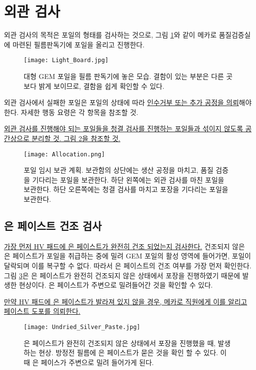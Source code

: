 \section{외관 검사}
외관 검사의 목적은 포일의 형태를 검사하는 것으로, 그림 \ref{fig:light_board}와 같이 메카로 품질검증실에 마련된 필름판독기에 포일을 올리고 진행한다.

\begin{figure}[htb]
  \centering
  \texttt{[image: Light\_Board.jpg]}
  \caption[대형 GEM 포일을 필름 판독기에 놓은 모습]{대형 GEM 포일을 필름 판독기에 놓은 모습. 결함이 있는 부분은 다른 곳보다 밝게 보이므로, 결함을 쉽게 확인할 수 있다.}
  \label{fig:light_board}
\end{figure}

외관 검사에서 실패한 포일은 포일의 상태에 따라 \uline{인수거부 또는 추가 공정을 의뢰}해야 한다. 자세한 행동 요령은 각 항목을 참조할 것.

\uline{외관 검사를 진행해야 되는 포일들을 청결 검사를 진행하는 포일들과 섞이지 않도록 공간상으로 분리할 것. 그림 \ref{fig:allocation}을 참조할 것.} 

\begin{figure}[htb]
  \centering
  \texttt{[image: Allocation.png]}
  \caption[포일 임시 보관 계획]{포일 임시 보관 계획. 보관함의 상단에는 생산 공정을 마치고, 품질 검증을 기다리는 포일을 보관한다. 하단 왼쪽에는 외관 검사를 마친 포일을 보관한다. 하단 오른쪽에는 청결 검사를 마치고 포장을 기다리는 포일을 보관한다.}
  \label{fig:allocation}
\end{figure}

\subsection{은 페이스트 건조 검사}
\uline{가장 먼저 HV 패드에 은 페이스트가 완전히 건조 되었는지 검사한다.} 건조되지 않은 은 페이스트가 포일을 취급하는 중에 밀려 GEM 포일의 활성 영역에 들어가면, 포일이 달락되며 이를 복구할 수 없다. 따라서 은 페이스트의 건조 여부를 가장 먼저 확인한다. 그림 \ref{fig:undried_paste}은 은 페이스트가 완전히 건조되지 않은 상태에서 포장을 진행하였기 때문에 발생한 현상이다. 은 페이스트가 주변으로 밀려들어간 것을 확인할 수 있다.

\uline{만약 HV 패드에 은 페이스트가 발라져 있지 않을 경우, 메카로 직원에게 이를 알리고 페이스트 도포를 의뢰한다.}

\begin{figure}[htb]
  \centering
  \texttt{[image: Undried\_Silver\_Paste.jpg]}
  \caption[건조되지 않은 은 페이스트]{은 페이스트가 완전히 건조되지 않은 상태에서 포장을 진행했을 때, 발생하는 현상. 방정전 필름에 은 페이스트가 묻은 것을 확인 할 수 있다. 이 때 은 페이스가 주변으로 밀려 들어가게 된다.}
  \label{fig:undried_paste}
\end{figure}

